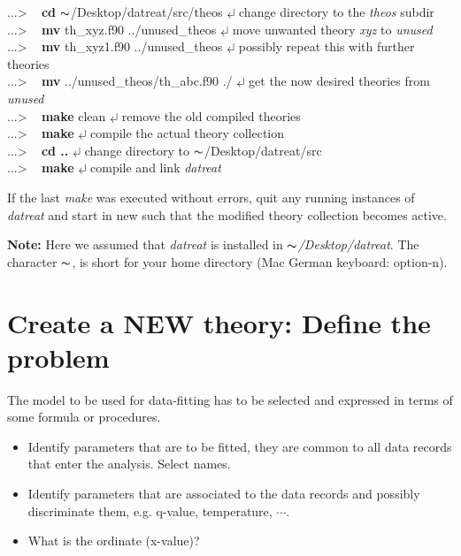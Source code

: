 \documentclass[11pt,fleqn]{book} %
\newcommand{\linespace}{\vspace{4ex}}
\newcommand{\return}{$\carriagereturn$} %
\newcommand{\sysprompt}{{\color{green}...\textgreater} ~ }
\newcommand{\home}{${\thicksim}$/Desktop}
\newcommand{\enter}[1]{{\color{red} \bf #1}}
\newcommand{\expl}[1]{\hskip 0.5cm {\color{explgray} #1}}
\begin{document}
\begin{corollary}
\sysprompt {\bf cd} \home/datreat/src/theos  \return  \expl{change directory to the {\it theos} subdir}\\
\sysprompt {\bf mv} th\_xyz.f90 ../unused\_theos   \return \expl{move unwanted theory \emph{xyz} to \emph{unused}} \\
\sysprompt {\bf mv} th\_xyz1.f90 ../unused\_theos   \return \expl{possibly repeat this with further theories} \\
\sysprompt {\bf mv} ../unused\_theos/th\_abc.f90 ./  \return \expl{get the now desired theories from {\it unused}} \\
\sysprompt {\bf make} clean \return \expl{remove the old compiled theories} \\
\sysprompt {\bf make}  \return \expl{compile the actual theory collection}\\
\sysprompt {\bf cd ..}  \return \expl{change directory to \home/datreat/src}\\
\sysprompt {\bf make}  \return \expl{compile and link \emph{datreat}}
\end{corollary}
If the last \emph{make} was executed without errors, quit any running instances of 
\emph{datreat} and start in new such that the modified theory collection becomes active.

\linespace
{\bf Note:} Here we assumed that \emph{datreat} is installed in {\it \home/datreat}. 
The character ${\thicksim}$, is short for your home directory (Mac German keyboard: option-n).
 
\section{Create a NEW theory: Define the problem}
\label{sec:problem}

The model to be used for data-fitting has to be selected and expressed in terms
of some formula or procedures.

\begin{itemize}
\item Identify parameters that are to be fitted, they are common to all data records that enter
      the analysis. Select names.
\item Identify parameters that are associated to the data records and possibly discriminate them,
      e.g. q-value, temperature, $\cdots$.
\item What is the ordinate (x-value)?
\end{itemize}
\end{document}
